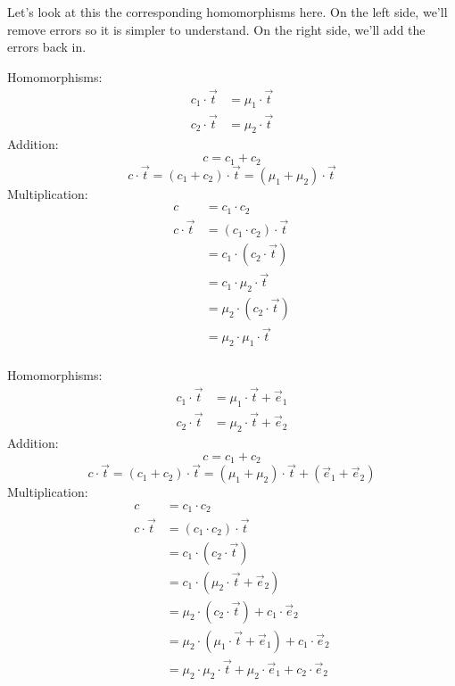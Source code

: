 Let's look at this the corresponding homomorphisms here. On the left side, we'll remove errors so it is simpler to understand. On the right side, we'll add the errors back in.

\begin{minipage}{0.5\textwidth}
    Homomorphisms:
    \begin{align*}
        c_1\cdot \vec{t} & = \mu_1\cdot \vec{t} \\
        c_2\cdot \vec{t} & = \mu_2\cdot \vec{t}
    \end{align*}
    Addition:
    \[c = c_1 + c_2\]
    \[c\cdot \vec{t} = (c_1 + c_2)\cdot\vec{t} = (\mu_1 + \mu_2)\cdot \vec{t}\]
    Multiplication:
    \begin{align*}
        c              & = c_1\cdot c_2                  \\
        c\cdot \vec{t} & = (c_1\cdot c_2)\cdot \vec{t}   \\
                       & = c_1\cdot (c_2\cdot \vec{t})   \\
                       & = c_1\cdot \mu_2\cdot \vec{t}   \\
                       & = \mu_2\cdot (c_2\cdot \vec{t}) \\
                       & = \mu_2\cdot \mu_1\cdot \vec{t} \\
    \end{align*}
\end{minipage}%
\begin{minipage}{0.5\textwidth}
    Homomorphisms:
    \begin{align*}
        c_1\cdot \vec{t} & = \mu_1\cdot \vec{t} + \vec{e}_1 \\
        c_2\cdot \vec{t} & = \mu_2\cdot \vec{t} + \vec{e}_2
    \end{align*}
    Addition:
    \[c = c_1 + c_2\]
    \[c\cdot \vec{t} = (c_1 + c_2)\cdot\vec{t} = (\mu_1 + \mu_2)\cdot \vec{t} + (\vec{e}_1 + \vec{e}_2)\]
    Multiplication:
    \begin{align*}
        c              & = c_1\cdot c_2                                                                      \\
        c\cdot \vec{t} & = (c_1\cdot c_2)\cdot \vec{t}                                                       \\
                       & = c_1\cdot (c_2\cdot \vec{t})                                                       \\
                       & = c_1\cdot (\mu_2\cdot \vec{t} + \vec{e}_2)                                         \\
                       & = \mu_2\cdot (c_2\cdot \vec{t}) + c_1\cdot \vec{e}_2                                \\
                       & = \mu_2\cdot (\mu_1\cdot \vec{t} + \vec{e}_1) + c_1\cdot \vec{e}_2                  \\
                       & = \mu_2\cdot \mu_2\cdot \vec{t} + \mu_2\cdot \vec{e}_1 + \boxed{c_2\cdot \vec{e}_2}
    \end{align*}
\end{minipage}

